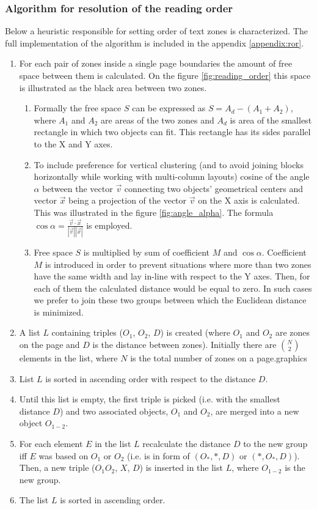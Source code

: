 \subsubsection{Algorithm for resolution of the reading order}
Below a heuristic responsible for setting order of text zones is characterized. The full implementation of the algorithm is included in the appendix \ref{appendix:ror}.

\begin{enumerate}
\item For each pair of zones inside a single page boundaries the amount of free space between them is calculated. On the figure \ref{fig:reading_order} this space is illustrated as the black area between two zones. 
	\begin{enumerate} 
	\item Formally the free space $S$ can be expressed as $S = A_d - (A_1+A_2)$, where $A_1$ and $A_2$ are areas of the two zones and $A_d$ is area of the smallest rectangle in which two objects can fit. This rectangle has its sides parallel to the X and Y axes.
	\item To include preference for vertical clustering (and to avoid joining blocks horizontally while working with multi-column layouts) cosine of the angle $\alpha$ between the vector $\vec{v}$ connecting two objects' geometrical centers and vector $\vec{x}$ being a projection of the vector $\vec{v}$ on the X axis is calculated. This was illustrated in the figure \ref{fig:angle_alpha}. The formula $\cos\alpha = \frac{\vec{v} \cdot \vec{x}}{|\vec{v}||\vec{x}|}$ is employed.
	\item Free space $S$ is multiplied by sum of coefficient $M$ and $\cos\alpha$. Coefficient $M$ is introduced in order to prevent situations where more than two zones have the same width and lay in-line with respect to the Y axes. Then, for each of them the calculated distance would be equal to zero. In such cases we prefer to join these two groups between which the Euclidean distance is minimized.
	\end{enumerate}
\item A list $L$ containing triples ($O_1$, $O_2$, $D$) is created (where $O_1$ and $O_2$ are zones on the page and $D$ is the distance between zones). Initially there are $\binom{N}{2}$ elements in the list, where $N$ is the total number of zones on a page.graphics
\item List $L$ is sorted in ascending order with respect to the distance $D$. 
\item Until this list is empty, the first triple is picked (i.e. with the smallest distance $D$) and two associated objects, $O_1$ and $O_2$, are merged into a new object $O_{1-2}$.
\item For each element $E$ in the list $L$ recalculate the distance $D$ to the new group iff $E$ was based on $O_1$ or $O_2$ (i.e. is in form of $(O_*, *, D)$ or $(*, O_*, D)$). Then, a new triple ($O_1O_2$, $X$, $D$) is inserted in the list $L$, where $O_{1-2}$ is the new group.
\item The list $L$ is sorted in ascending order.
\end{enumerate}
